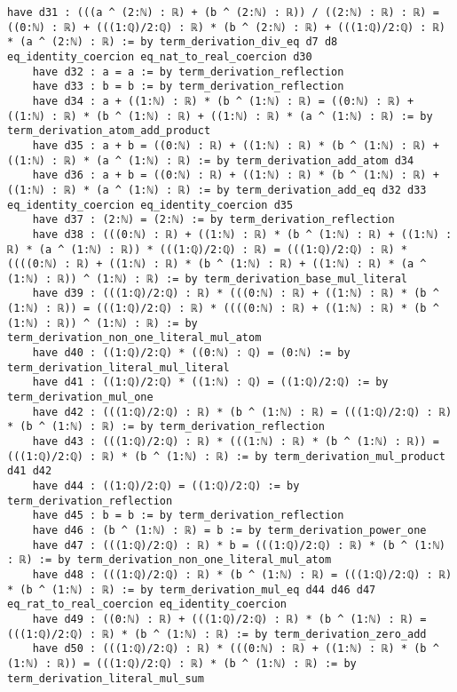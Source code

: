 \documentclass{article}
\begin{document}
\begin{tcolorbox}[colback=white!10, width=\linewidth]
\begin{lstlisting}[language=Lean4]
    have d31 : (((a ^ (2:ℕ) : ℝ) + (b ^ (2:ℕ) : ℝ)) / ((2:ℕ) : ℝ) : ℝ) = ((0:ℕ) : ℝ) + (((1:ℚ)/2:ℚ) : ℝ) * (b ^ (2:ℕ) : ℝ) + (((1:ℚ)/2:ℚ) : ℝ) * (a ^ (2:ℕ) : ℝ) := by term_derivation_div_eq d7 d8 eq_identity_coercion eq_nat_to_real_coercion d30
    have d32 : a = a := by term_derivation_reflection
    have d33 : b = b := by term_derivation_reflection
    have d34 : a + ((1:ℕ) : ℝ) * (b ^ (1:ℕ) : ℝ) = ((0:ℕ) : ℝ) + ((1:ℕ) : ℝ) * (b ^ (1:ℕ) : ℝ) + ((1:ℕ) : ℝ) * (a ^ (1:ℕ) : ℝ) := by term_derivation_atom_add_product
    have d35 : a + b = ((0:ℕ) : ℝ) + ((1:ℕ) : ℝ) * (b ^ (1:ℕ) : ℝ) + ((1:ℕ) : ℝ) * (a ^ (1:ℕ) : ℝ) := by term_derivation_add_atom d34
    have d36 : a + b = ((0:ℕ) : ℝ) + ((1:ℕ) : ℝ) * (b ^ (1:ℕ) : ℝ) + ((1:ℕ) : ℝ) * (a ^ (1:ℕ) : ℝ) := by term_derivation_add_eq d32 d33 eq_identity_coercion eq_identity_coercion d35
    have d37 : (2:ℕ) = (2:ℕ) := by term_derivation_reflection
    have d38 : (((0:ℕ) : ℝ) + ((1:ℕ) : ℝ) * (b ^ (1:ℕ) : ℝ) + ((1:ℕ) : ℝ) * (a ^ (1:ℕ) : ℝ)) * (((1:ℚ)/2:ℚ) : ℝ) = (((1:ℚ)/2:ℚ) : ℝ) * ((((0:ℕ) : ℝ) + ((1:ℕ) : ℝ) * (b ^ (1:ℕ) : ℝ) + ((1:ℕ) : ℝ) * (a ^ (1:ℕ) : ℝ)) ^ (1:ℕ) : ℝ) := by term_derivation_base_mul_literal
    have d39 : (((1:ℚ)/2:ℚ) : ℝ) * (((0:ℕ) : ℝ) + ((1:ℕ) : ℝ) * (b ^ (1:ℕ) : ℝ)) = (((1:ℚ)/2:ℚ) : ℝ) * ((((0:ℕ) : ℝ) + ((1:ℕ) : ℝ) * (b ^ (1:ℕ) : ℝ)) ^ (1:ℕ) : ℝ) := by term_derivation_non_one_literal_mul_atom
    have d40 : ((1:ℚ)/2:ℚ) * ((0:ℕ) : ℚ) = (0:ℕ) := by term_derivation_literal_mul_literal
    have d41 : ((1:ℚ)/2:ℚ) * ((1:ℕ) : ℚ) = ((1:ℚ)/2:ℚ) := by term_derivation_mul_one
    have d42 : (((1:ℚ)/2:ℚ) : ℝ) * (b ^ (1:ℕ) : ℝ) = (((1:ℚ)/2:ℚ) : ℝ) * (b ^ (1:ℕ) : ℝ) := by term_derivation_reflection
    have d43 : (((1:ℚ)/2:ℚ) : ℝ) * (((1:ℕ) : ℝ) * (b ^ (1:ℕ) : ℝ)) = (((1:ℚ)/2:ℚ) : ℝ) * (b ^ (1:ℕ) : ℝ) := by term_derivation_mul_product d41 d42
    have d44 : ((1:ℚ)/2:ℚ) = ((1:ℚ)/2:ℚ) := by term_derivation_reflection
    have d45 : b = b := by term_derivation_reflection
    have d46 : (b ^ (1:ℕ) : ℝ) = b := by term_derivation_power_one
    have d47 : (((1:ℚ)/2:ℚ) : ℝ) * b = (((1:ℚ)/2:ℚ) : ℝ) * (b ^ (1:ℕ) : ℝ) := by term_derivation_non_one_literal_mul_atom
    have d48 : (((1:ℚ)/2:ℚ) : ℝ) * (b ^ (1:ℕ) : ℝ) = (((1:ℚ)/2:ℚ) : ℝ) * (b ^ (1:ℕ) : ℝ) := by term_derivation_mul_eq d44 d46 d47 eq_rat_to_real_coercion eq_identity_coercion
    have d49 : ((0:ℕ) : ℝ) + (((1:ℚ)/2:ℚ) : ℝ) * (b ^ (1:ℕ) : ℝ) = (((1:ℚ)/2:ℚ) : ℝ) * (b ^ (1:ℕ) : ℝ) := by term_derivation_zero_add
    have d50 : (((1:ℚ)/2:ℚ) : ℝ) * (((0:ℕ) : ℝ) + ((1:ℕ) : ℝ) * (b ^ (1:ℕ) : ℝ)) = (((1:ℚ)/2:ℚ) : ℝ) * (b ^ (1:ℕ) : ℝ) := by term_derivation_literal_mul_sum

\end{lstlisting}
\end{tcolorbox}
\end{document}
